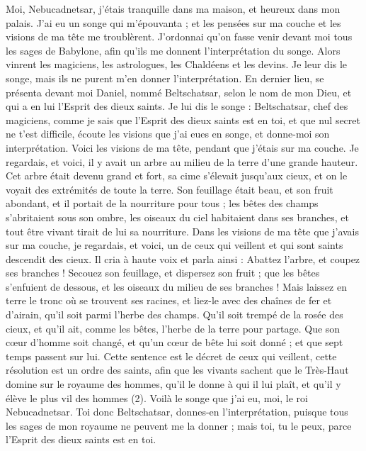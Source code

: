 \begin{multicols}{2}
Moi, Nebucadnetsar, j'étais tranquille dans ma maison, et heureux dans mon palais.
J’ai eu un songe qui m'épouvanta ; et les pensées sur ma couche et les visions de ma tête me troublèrent.
J’ordonnai qu'on fasse venir devant moi tous les sages de Babylone, afin qu'ils me donnent l'interprétation du songe.
Alors vinrent les magiciens, les astrologues, les Chaldéens et les devins. Je leur dis le songe, mais ils ne purent m'en donner l'interprétation.
En dernier lieu, se présenta devant moi Daniel, nommé Beltschatsar, selon le nom de mon Dieu, et qui a en lui l'Esprit des dieux saints. Je lui dis le songe :
Beltschatsar, chef des magiciens, comme je sais que l'Esprit des dieux saints est en toi, et que nul secret ne t'est difficile, écoute les visions que j’ai eues en songe, et donne-moi  son interprétation.
Voici les visions de ma tête, pendant que j’étais sur ma couche. Je regardais, et voici, il y avait  un arbre au milieu de la terre d’une grande hauteur.
Cet arbre était devenu grand et fort, sa cime s’élevait jusqu’aux cieux, et on le voyait des extrémités de toute la terre.
Son feuillage était beau, et son fruit abondant, et il portait de la nourriture pour tous ; les bêtes des champs s’abritaient sous son ombre, les oiseaux du ciel habitaient dans ses branches, et tout être vivant tirait de lui sa nourriture.
Dans les visions de ma tête que j’avais  sur ma couche, je regardais, et voici, un de ceux qui veillent et qui sont saints descendit des cieux.
Il cria à haute voix et parla ainsi : Abattez l'arbre, et coupez ses branches ! Secouez son feuillage, et dispersez son fruit ; que les bêtes s’enfuient de dessous, et les oiseaux du milieu de ses branches !
Mais laissez en terre le tronc où se trouvent ses racines, et liez-le avec des chaînes de fer et d'airain, qu'il soit parmi l'herbe des champs.  Qu'il soit trempé de la rosée des cieux, et qu'il ait, comme les bêtes, l'herbe de la terre pour partage.
Que son cœur d’homme soit changé, et qu’un cœur de bête lui soit donné ; et que sept temps passent sur lui.
Cette sentence est le décret de ceux qui veillent, cette résolution est un ordre des saints, afin que les vivants sachent que le Très-Haut domine sur le royaume des hommes, qu'il le donne à qui il lui plaît, et qu’il y élève le plus vil des hommes (2).
Voilà le songe que j’ai eu, moi, le roi Nebucadnetsar. Toi donc Beltschatsar, donnes-en l’interprétation, puisque tous les sages de mon royaume ne peuvent me la donner ; mais toi, tu le peux, parce l'Esprit des dieux saints est en toi.

\end{multicols}
